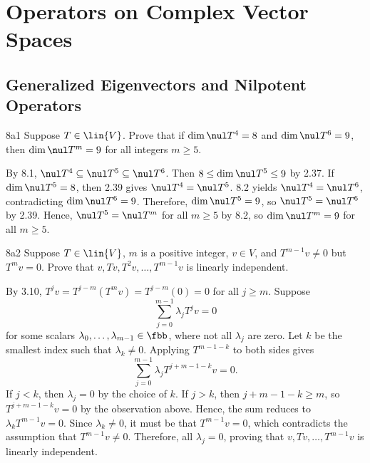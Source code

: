\section{Operators on Complex Vector Spaces}

\subsection{Generalized Eigenvectors and Nilpotent Operators}

\begin{exercise}{8a1}
    Suppose $T \in \lin{V}$.
    Prove that if $\dim \nul T^4 = 8$ and $\dim \nul T^6 = 9$, then $\dim \nul T^m = 9$ for all integers $m \geq 5$.
\end{exercise}

\begin{sol}
    By 8.1, $\nul T^4 \subseteq \nul T^5 \subseteq \nul T^6$.
    Then $8 \leq \dim \nul T^5 \leq 9$ by 2.37.
    If $\dim \nul T^5 = 8$, then 2.39 gives $\nul T^4 = \nul T^5$. 
    8.2 yields $\nul T^4 = \nul T^6$, contradicting $\dim \nul T^6 = 9$.
    Therefore, $\dim \nul T^5 = 9$, so $\nul T^5 = \nul T^6$ by 2.39.
    Hence, $\nul T^5 = \nul T^m$ for all $m \geq 5$ by 8.2, so $\dim \nul T^m = 9$ for all $m \geq 5$.
\end{sol}

\begin{exercise}{8a2}
    Suppose $T \in \lin{V}$, $m$ is a positive integer, $v \in V$, and $T^{m-1} v \neq 0$ but $T^m v = 0$.
    Prove that $v, Tv, T^2 v, \ldots, T^{m-1} v$ is linearly independent.

\end{exercise}

\begin{sol}
    By 3.10, $T^j v = T^{j-m}(T^m v) = T^{j-m}(0) = 0$ for all $j \geq m$.
    Suppose
    \[
        \sum_{j=0}^{m-1} \lambda_j T^j v = 0
    \]
    for some scalars $\lambda_0, \ldots, \lambda_{m-1} \in \fbb$, where not all $\lambda_j$ are zero.
    Let $k$ be the smallest index such that $\lambda_k \neq 0$.
    Applying $T^{m-1-k}$ to both sides gives
    \[
        \sum_{j=0}^{m-1} \lambda_j T^{j + m - 1 - k} v = 0.
    \]
    If $j < k$, then $\lambda_j = 0$ by the choice of $k$.
    If $j > k$, then $j + m - 1 - k \geq m$, so $T^{j + m - 1 - k} v = 0$ by the observation above.
    Hence, the sum reduces to $\lambda_k T^{m-1} v = 0$.
    Since $\lambda_k \neq 0$, it must be that $T^{m-1} v = 0$, which contradicts the assumption that $T^{m-1} v \neq 0$.
    Therefore, all $\lambda_j = 0$, proving that $v, Tv, \ldots, T^{m-1} v$ is linearly independent.
\end{sol}


